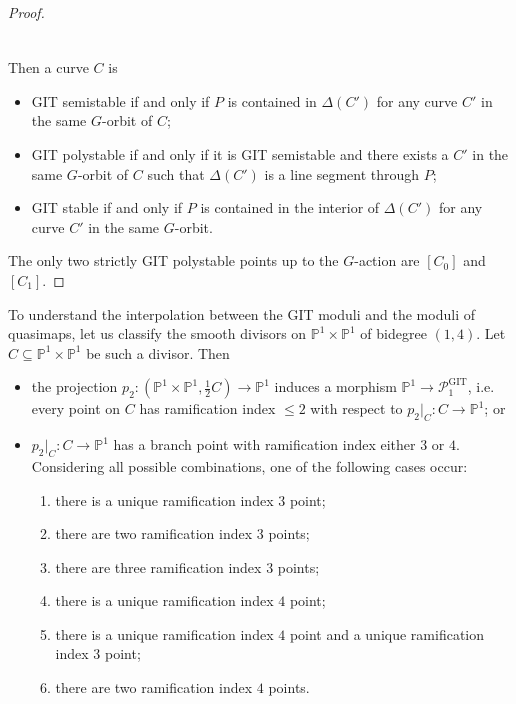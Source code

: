 \documentclass[a4paper,12pt]{amsart}
\DeclareMathOperator{\GIT}{GIT}
\newcommand{\bP}{{\mathbb P}}
\newcommand{\sP}{{\mathscr{P}}}
\theoremstyle{definition}
\theoremstyle{remark}
\begin{document}
\begin{proof}
\[\begin{tikzcd}
\end{tikzcd}\]
Then a curve $C$ is 
    \begin{itemize}
        \item GIT semistable if and only if $P$ is contained in $\Delta(C')$ for any curve $C'$ in the same $G$-orbit of $C$; 
        \item GIT polystable if and only if it is GIT semistable and there exists a $C'$ in the same $G$-orbit of $C$ such that $\Delta(C')$ is a line segment through $P$;
        \item GIT stable if and only if $P$ is contained in the interior of $\Delta(C')$ for any curve $C'$ in the same $G$-orbit.
    \end{itemize}
    The only two strictly GIT polystable points up to the $G$-action are $[C_0]$ and $[C_1]$. 
\end{proof}



To understand the interpolation between the GIT moduli and the moduli of quasimaps, let us classify the smooth divisors on $\bP^1\times\bP^1$ of bidegree $(1,4)$. Let $C\subseteq \bP^1\times\bP^1$ be such a divisor. Then 
\begin{itemize}
    \item the projection $p_2:(\bP^1\times\bP^1,\frac{1}{2}C)\rightarrow \bP^1$ induces a morphism $\bP^1\rightarrow \sP_1^{\GIT}$, i.e. every point on $C$ has ramification index $\leq 2$ with respect to $p_2|_C:C\rightarrow \bP^1$; or
    \item $p_2|_C:C\rightarrow \bP^1$ has a branch point with ramification index either $3$ or $4$. Considering all possible combinations, one of the following cases occur:
    \begin{enumerate}
        \item there is a unique ramification index $3$ point;
        \item there are two ramification index $3$ points;
        \item there are three ramification index $3$ points;
        \item there is a unique ramification index $4$ point;
        \item there is a unique ramification index $4$ point and a unique ramification index $3$ point;
        \item there are two ramification index $4$ points.
    \end{enumerate}
\end{itemize}
\end{document}
